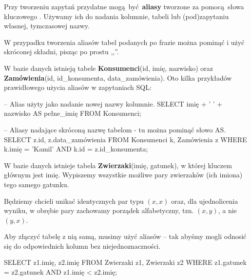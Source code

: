 Przy tworzeniu zapytań przydatne mogą być \textbf{aliasy} tworzone za pomocą słowa kluczowego . Używamy ich do nadania kolumnie, tabeli lub (pod)zapytaniu własnej, tymczasowej nazwy.

W przypadku tworzenia aliasów tabel podanych po frazie  można pominąć  i użyć skróconej składni, pisząc po prostu ,,''.

\begin{example}
    W bazie danych istnieją tabele \textbf{Konsumenci}(id, imię, nazwisko) oraz \textbf{Zamówienia}(id, id\_konsumenta, data\_zamówienia). Oto kilka przykładów prawidłowego użycia aliasów w zapytaniach SQL:
    \begin{sql}
        -- Alias użyty jako nadanie nowej nazwy kolumnie.
        SELECT imię + ' ' + nazwisko AS pełne_imię 
        FROM Konsumenci;
        
        -- Aliasy nadające skróconą nazwę tabelom - tu można pominąć słowo AS.
        SELECT z.id, z.data_zamówienia
        FROM Konsumenci k, Zamówienia z
        WHERE k.imię = 'Kamil' AND k.id = z.id_konsumenta;
    \end{sql}
\end{example}

\begin{example}
	W bazie danych istnieje tabela \textbf{Zwierzaki}(imię, gatunek), w której kluczem głównym jest imię. Wypiszemy wszystkie możliwe pary zwierzaków (ich imiona) tego samego gatunku.
	
	Będziemy chcieli unikać identycznych par typu $(x, x)$ oraz, dla ujednolicenia wyniku, w obrębie pary zachowamy porządek alfabetyczny, tzn. $(x, y)$, a nie $(y, x)$.
	
	Aby złączyć tabelę z nią samą, musimy użyć aliasów -- tak abyśmy mogli odnosić się do odpowiednich kolumn bez niejednoznaczności.
	
	\begin{sql}
		SELECT z1.imię, z2.imię
		FROM Zwierzaki z1, Zwierzaki z2
		WHERE z1.gatunek = z2.gatunek AND z1.imię < z2.imię;
	\end{sql}
\end{example}

